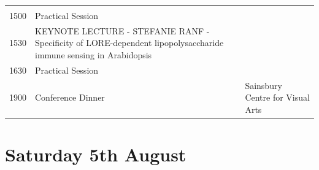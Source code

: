 \documentclass[12pt,]{book}
\theoremstyle{definition}
\theoremstyle{definition}
\theoremstyle{remark}
\begin{document}
\begin{longtable}[]{@{}lll@{}}
\begin{minipage}[t]{0.35\columnwidth}
\strut
\end{minipage}\tabularnewline
\begin{minipage}[t]{0.09\columnwidth}\raggedright\strut
1500\strut
\end{minipage} & \begin{minipage}[t]{0.35\columnwidth}\raggedright\strut
Practical Session\strut
\end{minipage} & \begin{minipage}[t]{0.35\columnwidth}\raggedright\strut
\strut
\end{minipage}\tabularnewline
\begin{minipage}[t]{0.09\columnwidth}\raggedright\strut
1530\strut
\end{minipage} & \begin{minipage}[t]{0.35\columnwidth}\raggedright\strut
KEYNOTE LECTURE - STEFANIE RANF - Specificity of LORE-dependent
lipopolysaccharide immune sensing in Arabidopsis\strut
\end{minipage} & \begin{minipage}[t]{0.35\columnwidth}\raggedright\strut
\strut
\end{minipage}\tabularnewline
\begin{minipage}[t]{0.09\columnwidth}\raggedright\strut
1630\strut
\end{minipage} & \begin{minipage}[t]{0.35\columnwidth}\raggedright\strut
Practical Session\strut
\end{minipage} & \begin{minipage}[t]{0.35\columnwidth}\raggedright\strut
\strut
\end{minipage}\tabularnewline
\begin{minipage}[t]{0.09\columnwidth}\raggedright\strut
1900\strut
\end{minipage} & \begin{minipage}[t]{0.35\columnwidth}\raggedright\strut
Conference Dinner\strut
\end{minipage} & \begin{minipage}[t]{0.35\columnwidth}\raggedright\strut
Sainsbury Centre for Visual Arts\strut
\end{minipage}\tabularnewline
\bottomrule
\end{longtable}

\section*{Saturday 5th August}\label{saturday-5th-august}
\end{document}
